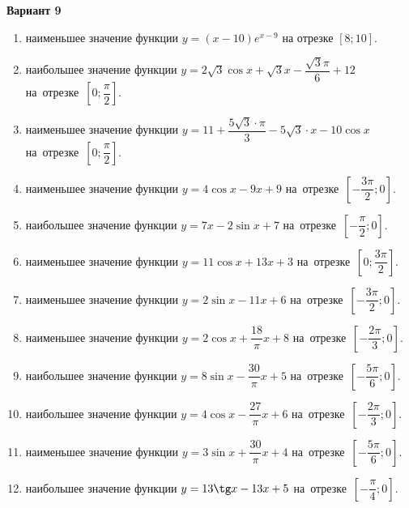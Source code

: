 \documentclass[a4paper,10pt]{article}
\begin{document}
\begin{center}\Large\textbf{Вариант 9}\end{center}

\begin{enumerate}
\item {} наименьшее значение функции $y=\left(x-10\right)e^{x-9}$ на отрезке $\left[8;10\right]$.

\item {} наибольшее значение функции $y=2\sqrt{3}\cos x+\sqrt{3}x-\dfrac{\sqrt{3}\pi }{6}+12$ на~отрезке~$\left[0;\dfrac{\pi }{2}\right]$.

\item {} наименьшее значение функции $y=11+\dfrac{5\sqrt{3}\cdot \pi }{3}-5\sqrt{3}\cdot x-10\cos x$ на~отрезке~$\left[0;\dfrac{\pi }{2}\right]$.

\item {} наименьшее значение функции $y=4\cos x-9x+9$ на~отрезке~$\left[-\dfrac{3\pi }{2};0\right]$.

\item {} наибольшее значение функции $y=7x-2\sin x+7$ на~отрезке~$\left[-\dfrac{\pi }{2};0\right]$.

\item {} наименьшее значение функции $y=11\cos x+13x+3$ на~отрезке~$\left[0;\dfrac{3\pi }{2}\right]$.

\item {} наименьшее значение функции $y=2\sin x-11x+6$ на~отрезке~$\left[-\dfrac{3\pi }{2};0\right]$.

\item {} наименьшее значение функции $y=2\cos x+\dfrac{18}{\pi }x+8$ на~отрезке~$\left[-\dfrac{2\pi }{3};0\right]$.

\item {} наибольшее значение функции $y=8\sin x-\dfrac{30}{\pi }x+5$ на~отрезке~$\left[-\dfrac{5\pi }{6};0\right]$.

\item {} наибольшее значение функции $y=4\cos x-\dfrac{27}{\pi }x+6$ на~отрезке~$\left[-\dfrac{2\pi }{3};0\right]$.

\item {} наименьшее значение функции $y=3\sin x+\dfrac{30}{\pi }x+4$ на~отрезке~$\left[-\dfrac{5\pi }{6};0\right]$.

\item {} наибольшее значение функции $y=13\tg x-13x+5$ на~отрезке~$\left[-\dfrac{\pi }{4};0\right]$.


\end{enumerate}
\end{document}
